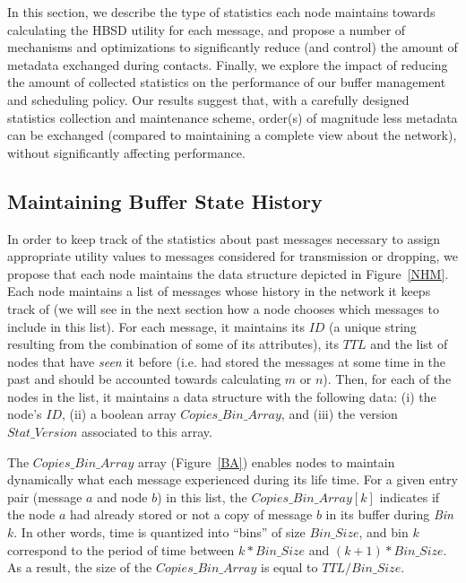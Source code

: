 In this section, we describe the type of statistics each node maintains towards calculating the HBSD utility for each message, and propose a number of mechanisms and optimizations to significantly reduce (and control) the amount of metadata exchanged during contacts. Finally, we explore the impact of reducing the amount of collected statistics on the performance of our buffer management and scheduling policy. Our results suggest that, with a carefully designed statistics collection and maintenance scheme, order(s) of magnitude less metadata can be exchanged (compared to maintaining a complete view about the network), without significantly affecting performance.

\subsection{Maintaining Buffer State History}
\label{NetworkHistoryModel}

In order to keep track of the statistics about past messages necessary to assign appropriate utility values to messages considered for transmission or dropping, we propose that each node maintains the data structure depicted in Figure~\ref{NHM}. Each node maintains a list of messages whose history in the network it keeps track of (we will see in the next section how a node chooses which messages to include in this list). For each message, it maintains its $ID$ (a unique string resulting from the combination of some of its attributes), its $TTL$ and the list of nodes that have \emph{seen} it before (i.e. had stored the messages at some time in the past and should be accounted towards calculating $m$ or $n$). Then, for each of the nodes in the list, it maintains a data structure with the following data: (i) the node's $ID$, (ii) a boolean array $Copies\_Bin\_Array$, and (iii) the version $Stat\_Version$ associated to this array.

The $Copies\_Bin\_Array$ array (Figure~\ref{BA}) enables nodes to maintain dynamically what each message experienced during its life time. For a given entry pair (message $a$ and node $b$) in this list, the $Copies\_Bin\_Array[k]$ indicates if the node $a$ had already stored or not a copy of message $b$ in its buffer during \emph{Bin} $k$. In other words, time is quantized into ``bins'' of size $Bin\_Size$, and bin $k$ correspond to the period of time between $k*Bin\_Size$ and $(k+1)*Bin\_Size$. As a result, the size of the $Copies\_Bin\_Array$ is equal to $TTL/Bin\_Size$.

